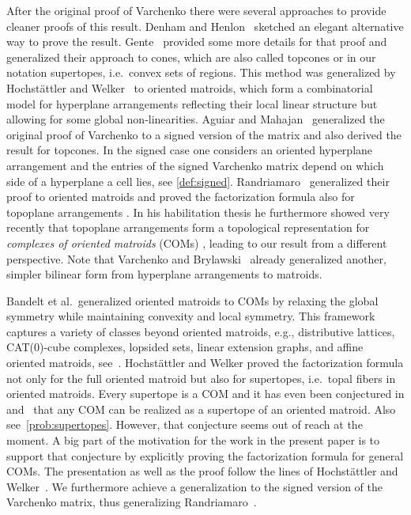 \documentclass[12pt]{amsart}
\theoremstyle{plain}
\numberwithin{Lemma}{\DefaultNumberTheoremWithin}
\numberwithin{Claim}{\DefaultNumberTheoremWithin}
\numberwithin{Theorem}{\DefaultNumberTheoremWithin}
\numberwithin{Corollary}{\DefaultNumberTheoremWithin}
\numberwithin{Proposition}{\DefaultNumberTheoremWithin}
\numberwithin{Conjecture}{\DefaultNumberTheoremWithin}
\numberwithin{Situation}{\DefaultNumberTheoremWithin}
\numberwithin{Note}{\DefaultNumberTheoremWithin}
\theoremstyle{definition}
\numberwithin{Definition}{\DefaultNumberTheoremWithin}
\theoremstyle{definition}
\numberwithin{Question}{\DefaultNumberTheoremWithin}
\theoremstyle{definition}
\numberwithin{Problem}{\DefaultNumberTheoremWithin}
\theoremstyle{remark} \newtheorem{Remark}{Remark}
\numberwithin{Remark}{\DefaultNumberTheoremWithin}
\theoremstyle{remark}
\numberwithin{Example}{\DefaultNumberTheoremWithin}
\numberwithin{Case}{Lemma}
\numberwithin{Step}{Lemma}
\begin{document}
After the original proof of Varchenko there were several approaches to
provide cleaner proofs of this result. Denham and
Henlon~\cite{DH} sketched an elegant alternative way to prove
the result. Gente~\cite{G} provided some more details for that
proof and  generalized their approach to cones, which are
also called topcones or in our notation supertopes, i.e.\ convex sets
of regions. This method was generalized by Hochst\"attler and
Welker~\cite{WH} to oriented matroids, which form a
combinatorial model for hyperplane arrangements reflecting their
local linear structure but allowing for some global non-linearities. 
Aguiar and Mahajan~\cite{AM} generalized the original proof of
Varchenko to a signed version of the matrix and also derived
the result for topcones. In the signed case one considers an oriented hyperplane arrangement and the entries of the signed Varchenko matrix depend on which side of a hyperplane a cell lies, see \ref{def:signed}.   Randriamaro~\cite{R1} generalized their proof to oriented matroids and proved the factorization formula also for topoplane arrangements \cite{R2}. In his habilitation thesis he furthermore showed very recently that topoplane arrangements form a topological representation for {\em complexes of
  oriented matroids} (COMs) \cite{R3}, leading to our result from a different perspective. 
Note that Varchenko and Brylawski~\cite{BV} already generalized another, simpler bilinear form from hyperplane arrangements to matroids.

Bandelt et al.\ generalized oriented matroids to COMs by relaxing the global symmetry while maintaining
convexity and local symmetry. This framework captures a variety of
classes beyond oriented matroids, e.g., distributive lattices,
CAT(0)-cube complexes, lopsided sets, linear extension graphs, and
affine oriented matroids, see~\cite{BCK}.
Hochstättler and Welker proved the factorization
  formula not only for the full oriented matroid but also for
  supertopes, i.e.\ topal fibers in oriented matroids.  Every
  supertope is a COM and it has even been conjectured in
  \cite[Conjecture 1]{BCK} and~\cite[Conjecture 1]{KM} that any COM
  can be realized as a supertope of an oriented matroid. Also see~\ref{prob:supertopes}. However,
  that conjecture seems out of reach at the moment.  A big part of the  motivation for the work in the present paper is to support that
  conjecture by explicitly proving the factorization formula for general 
  COMs.  The presentation as
well as the proof follow the lines of Hochst\"attler and
Welker~\cite{WH}.  We furthermore achieve a generalization to the signed version of the Varchenko matrix, thus generalizing
Randriamaro~\cite{R1}.
\end{document}
